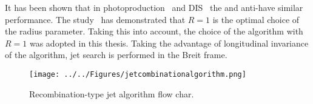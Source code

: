  It has been shown that in photoproduction~\cite{pub:incljetphp} and DIS~\cite{pub:claudia} the \kt and anti-\kt have similar performance. The study~\cite{pub:jetradius} has demonstrated that $R=1$ is the optimal choice of the radius parameter. Taking this into account, the choice of the \kt algorithm with $R=1$ was adopted in this thesis. Taking the advantage of longitudinal invariance of the algorithm, jet search is performed in the Breit frame.

\begin{figure}
	\centering
		\texttt{[image: ../../Figures/jetcombinationalgorithm.png]}
	\caption{Recombination-type jet algorithm flow char.}
	\label{fig:jetcombinationalgorithm}
\end{figure}
